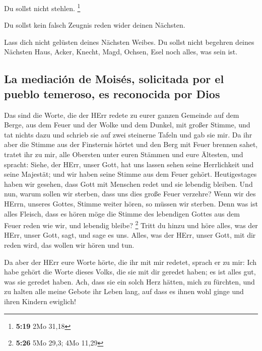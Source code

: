  Du sollst nicht stehlen. \footnote{\textbf{5:19} 2Mo
  31,18}

 Du sollst kein falsch Zeugnis reden wider deinen
Nächsten.

 Lass dich nicht gelüsten deines Nächsten Weibes. Du
sollst nicht begehren deines Nächsten Haus, Acker, Knecht, Magd, Ochsen,
Esel noch alles, was sein ist.

\hypertarget{la-mediaciuxf3n-de-moisuxe9s-solicitada-por-el-pueblo-temeroso-es-reconocida-por-dios}{%
\subsection{La mediación de Moisés, solicitada por el pueblo temeroso,
es reconocida por
Dios}\label{la-mediaciuxf3n-de-moisuxe9s-solicitada-por-el-pueblo-temeroso-es-reconocida-por-dios}}

 Das sind die Worte, die der HErr redete zu eurer ganzen
Gemeinde auf dem Berge, aus dem Feuer und der Wolke und dem Dunkel, mit
großer Stimme, und tat nichts dazu und schrieb sie auf zwei steinerne
Tafeln und gab sie mir.  Da ihr aber die Stimme aus der
Finsternis hörtet und den Berg mit Feuer brennen sahet, tratet ihr zu
mir, alle Obersten unter euren Stämmen und eure Ältesten,
 und spracht: Siehe, der HErr, unser Gott, hat uns lassen
sehen seine Herrlichkeit und seine Majestät; und wir haben seine Stimme
aus dem Feuer gehört. Heutigestages haben wir gesehen, dass Gott mit
Menschen redet und sie lebendig bleiben.  Und nun, warum
sollen wir sterben, dass uns dies große Feuer verzehre? Wenn wir des
HErrn, unseres Gottes, Stimme weiter hören, so müssen wir sterben.
 Denn was ist alles Fleisch, dass es hören möge die
Stimme des lebendigen Gottes aus dem Feuer reden wie wir, und lebendig
bleibe? \footnote{\textbf{5:26} 5Mo 29,3; 4Mo 11,29} 
Tritt du hinzu und höre alles, was der HErr, unser Gott, sagt, und sage
es uns. Alles, was der HErr, unser Gott, mit dir reden wird, das wollen
wir hören und tun.

 Da aber der HErr eure Worte hörte, die ihr mit mir
redetet, sprach er zu mir: Ich habe gehört die Worte dieses Volks, die
sie mit dir geredet haben; es ist alles gut, was sie geredet haben.
 Ach, dass sie ein solch Herz hätten, mich zu fürchten,
und zu halten alle meine Gebote ihr Leben lang, auf dass es ihnen wohl
ginge und ihren Kindern ewiglich!

